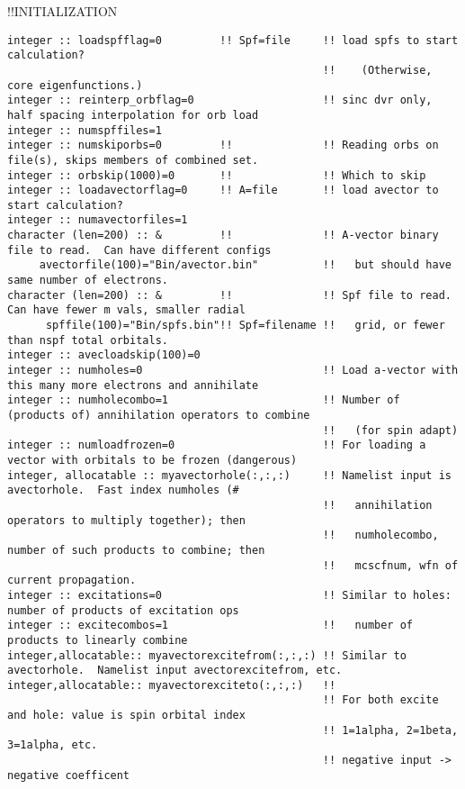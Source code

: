 !!{\large \quad INITIALIZATION}
\begin{verbatim}
integer :: loadspfflag=0         !! Spf=file     !! load spfs to start calculation?  
                                                 !!    (Otherwise, core eigenfunctions.)
integer :: reinterp_orbflag=0                    !! sinc dvr only, half spacing interpolation for orb load
integer :: numspffiles=1
integer :: numskiporbs=0         !!              !! Reading orbs on file(s), skips members of combined set.
integer :: orbskip(1000)=0       !!              !! Which to skip
integer :: loadavectorflag=0     !! A=file       !! load avector to start calculation?
integer :: numavectorfiles=1
character (len=200) :: &         !!              !! A-vector binary file to read.  Can have different configs
     avectorfile(100)="Bin/avector.bin"          !!   but should have same number of electrons.   
character (len=200) :: &         !!              !! Spf file to read.  Can have fewer m vals, smaller radial 
      spffile(100)="Bin/spfs.bin"!! Spf=filename !!   grid, or fewer than nspf total orbitals. 
integer :: avecloadskip(100)=0
integer :: numholes=0                            !! Load a-vector with this many more electrons and annihilate
integer :: numholecombo=1                        !! Number of (products of) annihilation operators to combine 
                                                 !!   (for spin adapt)
integer :: numloadfrozen=0                       !! For loading a vector with orbitals to be frozen (dangerous)
integer, allocatable :: myavectorhole(:,:,:)     !! Namelist input is avectorhole.  Fast index numholes (#
                                                 !!   annihilation operators to multiply together); then    
                                                 !!   numholecombo, number of such products to combine; then
                                                 !!   mcscfnum, wfn of current propagation.
integer :: excitations=0                         !! Similar to holes: number of products of excitation ops
integer :: excitecombos=1                        !!   number of products to linearly combine
integer,allocatable:: myavectorexcitefrom(:,:,:) !! Similar to avectorhole.  Namelist input avectorexcitefrom, etc.
integer,allocatable:: myavectorexciteto(:,:,:)   !!
                                                 !! For both excite and hole: value is spin orbital index
                                                 !! 1=1alpha, 2=1beta, 3=1alpha, etc.
                                                 !! negative input -> negative coefficent
\end{verbatim}
